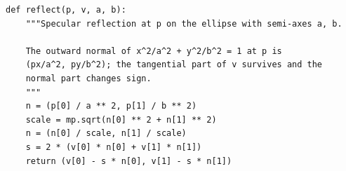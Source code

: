 \begin{verbatim}
def reflect(p, v, a, b):
    """Specular reflection at p on the ellipse with semi-axes a, b.

    The outward normal of x^2/a^2 + y^2/b^2 = 1 at p is
    (px/a^2, py/b^2); the tangential part of v survives and the
    normal part changes sign.
    """
    n = (p[0] / a ** 2, p[1] / b ** 2)
    scale = mp.sqrt(n[0] ** 2 + n[1] ** 2)
    n = (n[0] / scale, n[1] / scale)
    s = 2 * (v[0] * n[0] + v[1] * n[1])
    return (v[0] - s * n[0], v[1] - s * n[1])
\end{verbatim}
